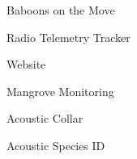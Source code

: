 \item Baboons on the Move
\item Radio Telemetry Tracker
\item Website
\item Mangrove Monitoring
\item Acoustic Collar
\item Acoustic Species ID
